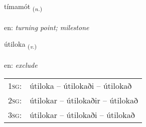 \documentclass[frontgrid, backgrid]{flacards}\usepackage[]{graphicx}\usepackage[]{xcolor}
\begin{document}
\renewcommand{\flhead}{\vskip5pt \fboxsep=0pt {\small\bfseries\footnotesize Nafnorð | Noun}}
\renewcommand{\fcfoot}{\vskip5pt \fboxsep=0pt \hspace{2pt}{\small\bfseries\footnotesize 3K}}

\renewcommand{\blhead}{\vskip5pt {\small\bfseries\footnotesize Nafnorð | Noun }}
\renewcommand{\bcfoot}{\vskip5pt \hspace{2pt}{\small\bfseries\footnotesize 3K}}


{tímamót \small{\textsubscript{(\textit{n.})}} \\[1ex] %
\textphonetic{[tʰiːmamout]} \\
en: \emph{turning point; milestone} \\  [2ex]
\renewcommand*{\arraystretch}{0.8}
}

\renewcommand{\flhead}{\vskip5pt \fboxsep=0pt {\small\bfseries\footnotesize Sagnorð | Verb}}
\renewcommand{\fcfoot}{\vskip5pt \fboxsep=0pt \hspace{2pt}{\small\bfseries\footnotesize 3K}}

\renewcommand{\blhead}{\vskip5pt {\small\bfseries\footnotesize Sagnorð | Verb }}
\renewcommand{\bcfoot}{\vskip5pt \hspace{2pt}{\small\bfseries\footnotesize 3K}}


{útiloka \small{\textsubscript{(\textit{v.})}} \\[1ex] %
\textphonetic{[uːtɪlɔka]} \\
en: \emph{exclude} \\  [2ex]
\renewcommand*{\arraystretch}{0.8}
\begin{tabular}{p{1cm}l}
\textsc{1sg}: & útiloka -- útilokaði -- útilokað \\ 
\textsc{2sg}: & útilokar -- útilokaðir -- útilokað \\ 
\textsc{3sg}: & útilokar -- útilokaði -- útilokað \\ 
\end{tabular}
}
\end{document}
